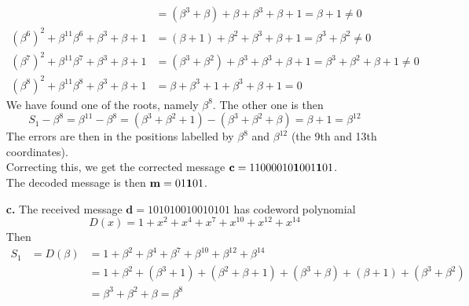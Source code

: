 \documentclass[11pt]{article}
\renewcommand{\vec}[1]{\mathbf{#1}}
\begin{document}
\begin{itemize}
\begin{align*}
                     &= (\beta^3 + \beta) + \beta         + \beta^3 + \beta + 1
                      =  \beta + 1
                      \neq 0\\
                        (\beta^6)^2 + \beta^{11}\beta^6   + \beta^3 + \beta + 1
                     &= (\beta + 1) + \beta^2             + \beta^3 + \beta + 1
                      =  \beta^3 + \beta^2
                      \neq 0\\
                        (\beta^7)^2 + \beta^{11}\beta^7   + \beta^3 + \beta + 1
                     &= (\beta^3 + \beta^2) + \beta^3     + \beta^3 + \beta + 1
                      =  \beta^3 + \beta^2 + \beta + 1
                      \neq 0\\
                        (\beta^8)^2 + \beta^{11}\beta^8   + \beta^3 + \beta + 1
                     &=  \beta      + \beta^3 + 1         + \beta^3 + \beta + 1
                      = 0
                   \end{align*}
                   We have found one of the roots, namely $\beta^8$.
                   The other one is then
                   \[
                     S_1 - \beta^8 = \beta^{11} - \beta^8
                                   = (\beta^3+\beta^2+1) - (\beta^3+\beta^2+\beta)
                                   = \beta + 1
                                   = \beta^{12}
                   \]
                   The errors are then in the positions labelled by $\beta^8$ and $\beta^{12}$
                   (the 9th and 13th coordinates).\\
                   Correcting this, we get the corrected message
                   $\vec{c} = \text{11000010{\bf1}001{\bf1}01}$.\\
                   The decoded message is then $\vec{m} = \text{01{\bf1}01}$.
  \item[{\bf c.}] The received message    $\vec{d} = \text{101010010010101}$
                  has codeword polynomial
                  \[
                     D(x) = 1 + x^2 + x^4 + x^7 + x^{10} + x^{12} + x^{14}
                  \]
                  Then
                  \[
                    \begin{array}{lll}
                      S_1 &= D(\beta)  &= 1 + \beta^2 +  \beta^4    +  \beta^7          +  \beta^{10}     +  \beta^{12} +  \beta^{14} \\
                          &            &= 1 + \beta^2 + (\beta^3+1) + (\beta^2+\beta+1) + (\beta^3+\beta) + (\beta+1)   + (\beta^3 + \beta^2) \\
                          &            &= \beta^3 + \beta^2 + \beta = \beta^8 \\

\end{array}\]
\end{itemize}
\end{document}
